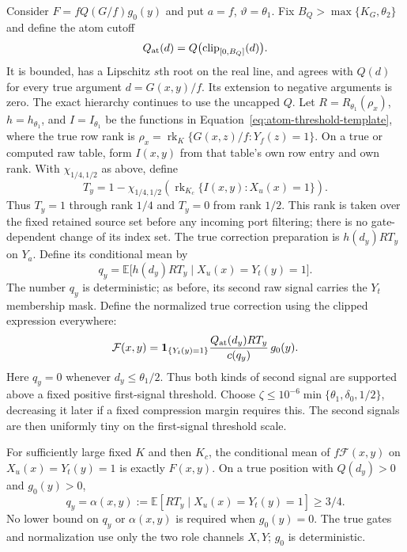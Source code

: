 Consider $F=fQ(G/f)g_0(y)$ and put $a=f$, $\vartheta=\theta_1$.
Fix $B_Q>\max\{K_G,\theta_2\}$ and define the atom cutoff
\[
 Q_{\rm at}(d)=Q\bigl(\operatorname{clip}_{[0,B_Q]}(d)\bigr).
\]
It is bounded, has a Lipschitz $s$th root on the real line, and agrees
with $Q(d)$ for every true argument $d=G(x,y)/f$.  Its extension to
negative arguments is zero.  The exact hierarchy continues to use the
uncapped $Q$.  Let $R=R_{\theta_1}(\rho_x)$, $h=h_{\theta_1}$, and
$I=I_{\theta_1}$ be the functions in
Equation~\eqref{eq:atom-threshold-template}, where the true row rank is
$\rho_x=\operatorname{rk}_K\{G(x,z)/f:Y_f(z)=1\}$.
On a true or computed raw table, form $I(x,y)$ from that table's own row
entry and own rank.
With $\chi_{1/4,1/2}$ as above, define
\begin{equation}
 T_y=1-\chi_{1/4,1/2}\left(
       \operatorname{rk}_{K_c}\{I(x,y):X_u(x)=1\}\right).
 \label{eq:atom-incoming-gate}
\end{equation}
Thus $T_y=1$ through rank $1/4$ and $T_y=0$ from rank $1/2$.
This rank is taken over the fixed retained source set before any incoming
port filtering; there is no gate-dependent change of its index set.
The true correction preparation is $h(d_y)R T_y$ on $Y_a$.
Define its conditional mean by
\begin{equation}
 q_y=\mathbb E\bigl[h(d_y)R T_y\mid X_u(x)=Y_t(y)=1\bigr].
 \label{eq:atom-correction-denominator}
\end{equation}
The number $q_y$ is deterministic; as before, its second raw signal
carries the $Y_t$ membership mask.  Define the normalized true correction
using the clipped expression everywhere:
\begin{equation}
 \mathcal F(x,y)=\mathbf1_{\{Y_t(y)=1\}}
     \frac{Q_{\rm at}(d_y)R T_y}{c(q_y)}\,g_0(y).
 \label{eq:atom-correction-table}
\end{equation}
Here $q_y=0$ whenever $d_y\le\theta_1/2$.  Thus both kinds of second
signal are supported above a fixed positive first-signal threshold.
Choose $\zeta\le10^{-6}\min\{\theta_1,\delta_0,1/2\}$, decreasing it
later if a fixed compression margin requires this.  The second signals
are then uniformly tiny on the first-signal threshold scale.

\begin{lemma}
\label{lem:atom-correction}
For sufficiently large fixed $K$ and then $K_c$, the conditional mean of
$f\mathcal F(x,y)$ on $X_u(x)=Y_t(y)=1$ is exactly $F(x,y)$.
On a true position with $Q(d_y)>0$ and $g_0(y)>0$,
\begin{equation}
 q_y=\alpha(x,y):=
  \mathbb E[R T_y\mid X_u(x)=Y_t(y)=1]\ge3/4.
 \label{eq:atom-alpha-bound}
\end{equation}
No lower bound on $q_y$ or $\alpha(x,y)$ is required when $g_0(y)=0$.
The true gates and normalization use only the two role channels $X,Y$;
$g_0$ is deterministic.
\end{lemma}

